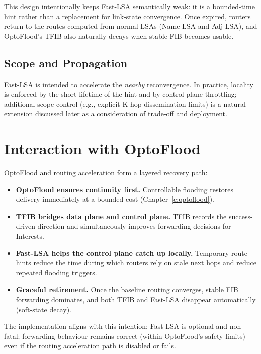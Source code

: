 This design intentionally keeps Fast-LSA semantically weak: it is a bounded-time hint rather than a replacement for link-state convergence. Once expired, routers return to the routes computed from normal LSAs (Name LSA and Adj LSA), and OptoFlood’s TFIB also naturally decays when stable FIB becomes usable.

\subsection{Scope and Propagation}
Fast-LSA is intended to accelerate the \emph{nearby} reconvergence. In practice, locality is enforced by the short lifetime of the hint and by control-plane throttling; additional scope control (e.g., explicit K-hop dissemination limits) is a natural extension discussed later as a consideration of trade-off and deployment.


\section{Interaction with OptoFlood}
\label{sec:routingacc:interaction_with_optoFlood}

OptoFlood and routing acceleration form a layered recovery path:

\begin{itemize}
  \item \textbf{OptoFlood ensures continuity first.} Controllable flooding restores delivery immediately at a bounded cost (Chapter~\ref{c:optoflood}).
  \item \textbf{TFIB bridges data plane and control plane.} TFIB records the success-driven direction and simultaneously improves forwarding decisions for Interests.
  \item \textbf{Fast-LSA helps the control plane catch up locally.} Temporary route hints reduce the time during which routers rely on stale next hops and reduce repeated flooding triggers.
  \item \textbf{Graceful retirement.} Once the baseline routing converges, stable FIB forwarding dominates, and both TFIB and Fast-LSA disappear automatically (soft-state decay).
\end{itemize}

The implementation aligns with this intention: Fast-LSA is optional and non-fatal; forwarding behaviour remains correct (within OptoFlood’s safety limits) even if the routing acceleration path is disabled or fails.

